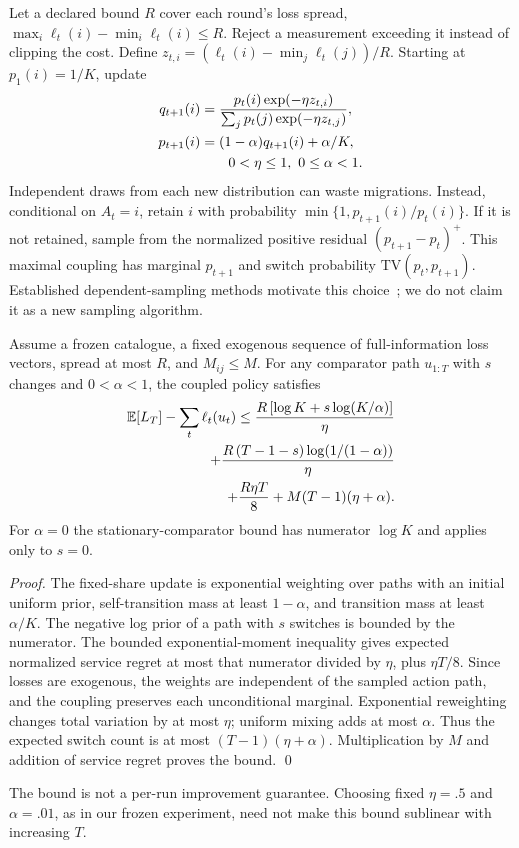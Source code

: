 Let a declared bound $R$ cover each round's loss spread,
$\max_i\ell_t(i)-\min_i\ell_t(i)\le R$. Reject a measurement exceeding it instead
of clipping the cost. Define $z_{t,i}=(\ell_t(i)-\min_j\ell_t(j))/R$. Starting at
$p_1(i)=1/K$, update
\begin{align}q_{t+1}(i)&=\frac{p_t(i)\exp(-\eta z_{t,i})}{\sum_j p_t(j)\exp(-\eta z_{t,j})},\label{eq:fixedshare}\\
p_{t+1}(i)&=(1-\alpha)q_{t+1}(i)+\alpha/K,\label{eq:mixing}\\
&\qquad 0<\eta\le1,\ 0\le\alpha<1.\notag\end{align}
Independent draws from each new distribution can waste migrations. Instead,
conditional on $A_t=i$, retain $i$ with probability
$\min\{1,p_{t+1}(i)/p_t(i)\}$. If it is not retained, sample from the normalized
positive residual $(p_{t+1}-p_t)^+$. This maximal coupling has marginal $p_{t+1}$
and switch probability $\mathrm{TV}(p_t,p_{t+1})$. Established dependent-sampling
methods motivate this choice~\cite{geulen}; we do not claim it as a new sampling
algorithm.

\begin{theorem}\label{thm:tracking}
Assume a frozen catalogue, a fixed exogenous sequence of full-information loss
vectors, spread at most $R$, and $M_{ij}\le M$. For any comparator path $u_{1:T}$
with $s$ changes and $0<\alpha<1$, the coupled policy satisfies
\begin{align}
\mathbb E[L_T]-\sum_t\ell_t(u_t)\le
\frac{R\,[\log K+s\log(K/\alpha)]}{\eta}\notag\\
+\frac{R\,(T-1-s)\log(1/(1-\alpha))}{\eta}\notag\\
+\frac{R\eta T}{8}+M(T-1)(\eta+\alpha).\label{eq:tracking}\end{align}
For $\alpha=0$ the stationary-comparator bound has numerator $\log K$ and applies
only to $s=0$.
\end{theorem}
\begin{proof}
The fixed-share update is exponential weighting over paths with an initial uniform
prior, self-transition mass at least $1-\alpha$, and transition mass at least
$\alpha/K$. The negative log prior of a path with $s$ switches is bounded by the
numerator. The bounded exponential-moment inequality gives expected normalized
service regret at most that numerator divided by $\eta$, plus $\eta T/8$. Since
losses are exogenous, the weights are independent of the sampled action path, and
the coupling preserves each unconditional marginal. Exponential reweighting
changes total variation by at most $\eta$; uniform mixing adds at most $\alpha$.
Thus the expected switch count is at most $(T-1)(\eta+\alpha)$.
Multiplication by $M$ and addition of service regret proves the bound. \qed
\end{proof}
The bound is not a per-run improvement guarantee. Choosing fixed $\eta=.5$ and
$\alpha=.01$, as in our frozen experiment, need not make this bound sublinear with
increasing $T$.


